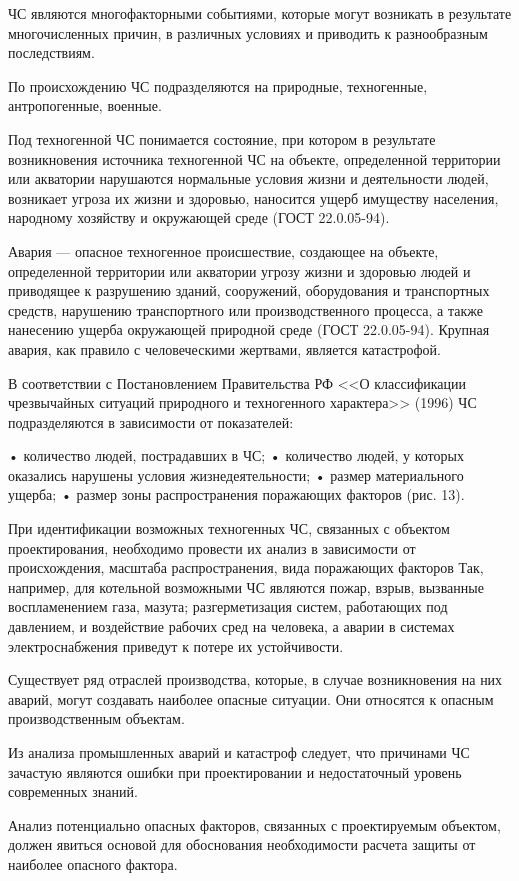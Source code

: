 ЧС являются многофакторными событиями, которые могут возникать в результате многочисленных причин, в различных условиях и приводить к разнообразным последствиям.

По происхождению ЧС подразделяются на природные, техногенные, антропогенные, военные.

Под техногенной ЧС понимается состояние, при котором в результате возникновения источника техногенной ЧС на объекте, определенной территории или акватории нарушаются нормальные условия жизни и деятельности людей, возникает угроза их жизни и здоровью, наносится ущерб имуществу населения, народному хозяйству и окружающей среде (ГОСТ 22.0.05-94).

Авария --- опасное техногенное происшествие, создающее на объекте, определенной территории или акватории угрозу жизни и здоровью людей и приводящее к разрушению зданий, сооружений, оборудования и транспортных средств, нарушению транспортного или производственного процесса, а также нанесению ущерба окружающей природной среде (ГОСТ 22.0.05-94). Крупная авария, как правило с человеческими жертвами, является катастрофой.

В соответствии с Постановлением Правительства РФ <<О классификации чрезвычайных ситуаций природного и техногенного характера>> (1996) ЧС подразделяются в зависимости от показателей:

• количество людей, пострадавших в ЧС;
• количество людей, у которых оказались нарушены условия жизнедеятельности;
• размер материального ущерба;
• размер зоны распространения поражающих факторов (рис. 13).

При идентификации возможных техногенных ЧС, связанных с объектом проектирования, необходимо провести их анализ в зависимости от происхождения, масштаба распространения, вида поражающих факторов Так, например, для котельной возможными ЧС являются пожар, взрыв, вызванные воспламенением газа, мазута; разгерметизация систем, работающих под давлением, и воздействие рабочих сред на человека, а аварии в системах электроснабжения приведут к потере их устойчивости.

Существует ряд отраслей производства, которые, в случае возникновения на них аварий, могут создавать наиболее опасные ситуации. Они относятся к опасным производственным объектам. 

Из анализа промышленных аварий и катастроф следует, что причинами ЧС зачастую являются ошибки при проектировании и недостаточный уровень современных знаний.

Анализ потенциально опасных факторов, связанных с проектируемым объектом, должен явиться основой для обоснования необходимости расчета защиты от наиболее опасного фактора.

